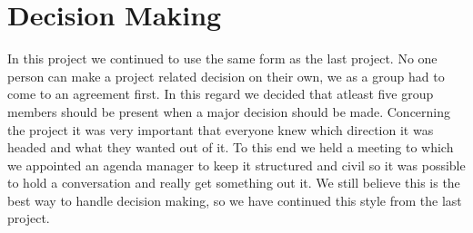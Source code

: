 \section{Decision Making}
In this project we continued to use the same form as the last project. No one person can make a project related decision on their own, we as a group had to come to an agreement first. In this regard we decided that atleast five group members should be present when a major decision should be made. Concerning the project it was very important that everyone knew which direction it was headed and what they wanted out of it.
To this end we held a meeting to which we appointed an agenda manager to keep it structured and civil so it was possible to hold a conversation and really get something out it.
We still believe this is the best way to handle decision making, so we have continued this style from the last project.